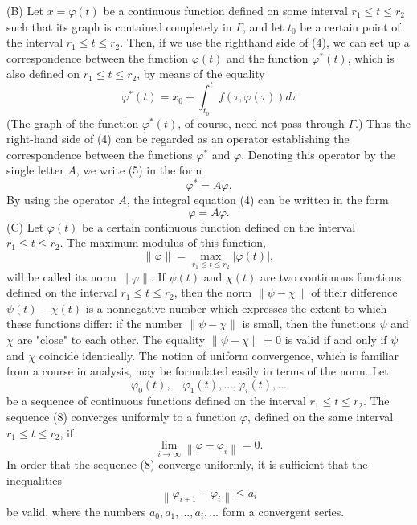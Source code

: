 \documentclass[10pt,a5paper]{book}
\theoremstyle{plain}
\theoremstyle{definition}
\theoremstyle{remark}
\begin{document}
(B) Let $x=\varphi(t)$ be a continuous function defined on some interval $r_{1} \leq t \leq r_{2}$ such that its graph is contained completely in $\Gamma$, and let $t_{0}$ be a certain point of the interval $r_{1} \leq t \leq r_{2}$. Then, if we use the righthand side of (4), we can set up a correspondence between the function $\varphi(t)$ and the function $\varphi^{*}(t)$, which is also defined on $r_{1} \leq t \leq r_{2}$, by means of the equality
\begin{equation*}
\varphi^{*}(t)=x_{0}+\int_{t_{0}}^{t} f(\tau, \varphi(\tau)) d \tau \tag{5}
\end{equation*}
(The graph of the function $\varphi^{*}(t)$, of course, need not pass through $\Gamma$.) Thus the right-hand side of (4) can be regarded as an operator establishing the correspondence between the functions $\varphi^{*}$ and $\varphi$. Denoting this operator by the single letter $A$, we write (5) in the form
\begin{equation*}
\varphi^{*}=A \varphi . \tag{6}
\end{equation*}
By using the operator $A$, the integral equation (4) can be written in the form
\begin{equation*}
\varphi=A \varphi . \tag{7}
\end{equation*}
(C) Let $\varphi(t)$ be a certain continuous function defined on the interval $r_{1} \leq t \leq r_{2}$. The maximum modulus of this function,
\[
\|\varphi\|=\max _{r_{1} \leq t \leq r_{2}}|\varphi(t)|,
\]
will be called its norm $\|\varphi\|$. If $\psi(t)$ and $\chi(t)$ are two continuous functions defined on the interval $r_{1} \leq t \leq r_{2}$, then the norm $\|\psi-\chi\|$ of their difference $\psi(t)-\chi(t)$ is a nonnegative number which expresses the extent to which these functions differ: if the number $\|\psi-\chi\|$ is small, then the functions $\psi$ and $\chi$ are "close" to each other. The equality $\|\psi-\chi\|=0$ is valid if and only if $\psi$ and $\chi$ coincide identically. The notion of uniform convergence, which is familiar from a course in analysis, may be formulated easily in terms of the norm. Let
\begin{equation*}
\varphi_{0}(t), \quad \varphi_{1}(t), \ldots, \varphi_{i}(t), \ldots \tag{8}
\end{equation*}
be a sequence of continuous functions defined on the interval $r_{1} \leq t \leq r_{2}$. The sequence (8) converges uniformly to a function $\varphi$, defined on the same interval $r_{1} \leq t \leq r_{2}$, if
\[
\lim _{i \rightarrow \infty}\left\|\varphi-\varphi_{i}\right\|=0 .
\]
In order that the sequence (8) converge uniformly, it is sufficient that the inequalities
\[
\left\|\varphi_{i+1}-\varphi_{i}\right\| \leq a_{i}
\]
be valid, where the numbers $a_{0}, a_{1}, \ldots, a_{i}, \ldots$ form a convergent series.
\end{document}
